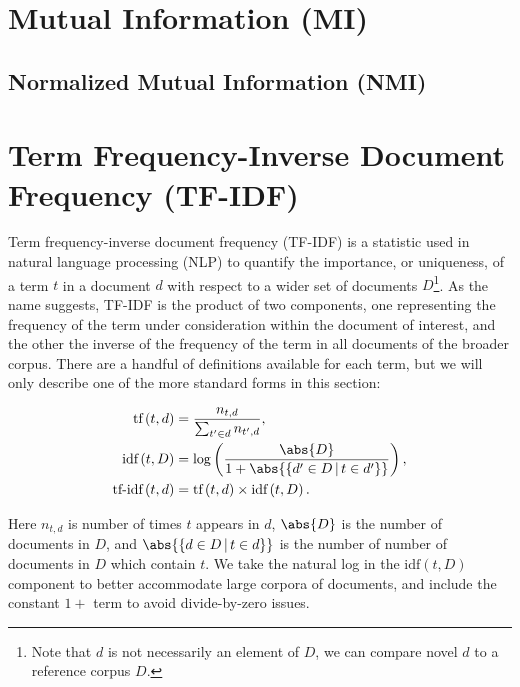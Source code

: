 \section{Mutual Information (MI)}
\label{dim_reduct:MI}

\subsection{Normalized Mutual Information (NMI)}
\label{dim_reduct:MI:normalized}

\section{Term Frequency-Inverse Document Frequency (TF-IDF)}
\label{dim_reduct:tfidf}

Term frequency-inverse document frequency (TF-IDF) is a statistic
used in natural language processing (NLP) to quantify
the importance, or uniqueness, of a term $t$ in a document $d$
with respect to a wider set of documents $D$\footnote{Note that
$d$ is not necessarily an element of $D$,
we can compare novel $d$ to a reference corpus $D$.}.
As the name suggests, TF-IDF is the product of two components,
one representing the frequency of the term under consideration within the document of interest,
and the other the inverse of the frequency of the term in all documents of the broader corpus.
There are a handful of definitions available for each term, but we will only describe
one of the more standard forms in this section:

\begin{subequations}\label{eq:unsupervised:tfidf}
\begin{align}
\text{tf}\left(t,d\right) &= \frac{n_{t,d}}{\sum_{t' \in d} n_{t',d}}, \label{eq:unsupervised:tfidf:tf} \\
\text{idf}\left(t,D\right) &= \log\left(\frac{\abs{D}}{1 + \abs{\left\{d' \in D \, | \, t \in d'\right\}}}\right), \label{eq:unsupervised:tfidf:idf} \\
\text{tf-idf}\left(t,d\right) &= \text{tf}\left(t,d\right) \times \text{idf}\left(t,D\right). \label{eq:unsupervised:tfidf:tfidf}
\end{align}
\end{subequations}

\noindent Here $n_{t,d}$ is number of times $t$ appears in $d$,
$\abs{D}$ is the number of documents in $D$,
and $\abs{\left\{d \in D \, | \, t \in d\right\}}$ is the number of number of documents in $D$ which contain $t$.
We take the natural log in the $\text{idf}\left(t,D\right)$ component to better accommodate large corpora of documents,
and include the constant $1+$ term to avoid divide-by-zero issues.

